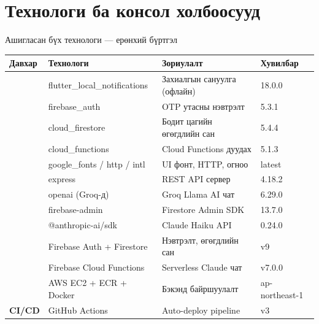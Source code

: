 \documentclass[14pt,aspectratio=169]{beamer}
\begin{document}
\section{Технологи ба консол холбоосууд}

\begin{frame}{Ашигласан бүх технологи — ерөнхий бүртгэл}
  \small
  \renewcommand{\arraystretch}{1.22}
  \begin{tabular}{llll}
    \toprule
    \rowcolor{navyblue}
    {\color{white}\textbf{Давхар}} &
    {\color{white}\textbf{Технологи}} &
    {\color{white}\textbf{Зориулалт}} &
    {\color{white}\textbf{Хувилбар}} \\
    \midrule
    \rowcolor{yellow!12}
    \multirow{5}{*}{\textbf{Flutter}} &
      flutter\_local\_notifications & Захиалгын сануулга (офлайн) & 18.0.0 \\
    \rowcolor{yellow!12}
      & firebase\_auth  & OTP утасны нэвтрэлт & 5.3.1 \\
    \rowcolor{yellow!12}
      & cloud\_firestore & Бодит цагийн өгөгдлийн сан & 5.4.4 \\
    \rowcolor{yellow!12}
      & cloud\_functions & Cloud Functions дуудах & 5.1.3 \\
    \rowcolor{yellow!12}
      & google\_fonts / http / intl & UI фонт, HTTP, огноо & latest \\
    \midrule
    \rowcolor{orange!10}
    \multirow{4}{*}{\textbf{Backend}} &
      express & REST API сервер & 4.18.2 \\
    \rowcolor{orange!10}
      & openai (Groq-д) & Groq Llama AI чат & 6.29.0 \\
    \rowcolor{orange!10}
      & firebase-admin & Firestore Admin SDK & 13.7.0 \\
    \rowcolor{orange!10}
      & @anthropic-ai/sdk & Claude Haiku API & 0.24.0 \\
    \midrule
    \rowcolor{blue!8}
    \multirow{3}{*}{\textbf{Cloud}} &
      Firebase Auth + Firestore & Нэвтрэлт, өгөгдлийн сан & v9 \\
    \rowcolor{blue!8}
      & Firebase Cloud Functions & Serverless Claude чат & v7.0.0 \\
    \rowcolor{blue!8}
      & AWS EC2 + ECR + Docker & Бэкэнд байршуулалт & ap-northeast-1 \\
    \midrule
    \rowcolor{green!8}
    \textbf{CI/CD} & GitHub Actions & Auto-deploy pipeline & v3 \\
    \bottomrule
  \end{tabular}
\end{frame}
\end{document}
